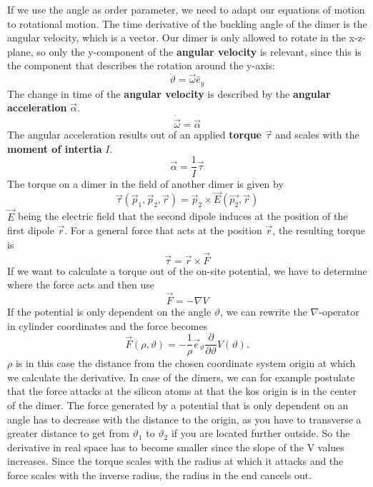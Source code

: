 	If we use the angle as order parameter, we need to adapt our equations of motion to rotational motion. The time derivative of the buckling angle of the dimer is the angular velocity, which is a vector. Our dimer is only allowed to rotate in the x-z-plane, so only the y-component of the \textbf{angular velocity} is relevant, since this is the component that describes the rotation around the y-axis:
	\begin{equation}
		\dot{\vartheta} =	\vec{\omega} \hat{e}_y
	\end{equation}
	The change in time of the \textbf{angular velocity} is described by the \textbf{angular acceleration} $\vec{\alpha}$.
	\begin{equation}
		\dot{\vec{\omega}} =	\vec{\alpha}
	\end{equation}
	The angular acceleration results out of an applied \textbf{torque} $\vec{\tau}$ and scales with the \textbf{moment of intertia} $I$.
	\begin{equation}
		\vec{\alpha}=	\frac{1}{I} \vec{\tau}
	\end{equation}
	The torque on a dimer in the field of another dimer is given by
	\begin{equation}
		\vec{\tau}(\vec{p}_1, \vec{p}_2, \vec{r}) =	\vec{p}_2 \times \vec{E}(\vec{p_2}, \vec{r})
	\end{equation}
	$\vec{E}$ being the electric field that the second dipole induces at the position of the first dipole $\vec{r}$. For a general force that acts at the position $\vec{r}$, the resulting torque is
	\begin{equation}
		\vec{\tau} =	\vec{r} \times \vec{F}
	\end{equation}
	If we want to calculate a torque out of the on-site potential, we have to determine where the force acts and then use
	\begin{equation}
		\vec{F} =	- \nabla V
	\end{equation}
	If the potential is only dependent on the angle $\vartheta$, we can rewrite the $\nabla$-operator in cylinder coordinates and the force becomes
	\begin{equation}
		\vec{F}(\rho, \vartheta) =	 - \frac{1}{\rho}  \vec{e}_\vartheta \frac{\partial}{\partial \vartheta} V(\vartheta).
	\end{equation}
	$\rho$ is in this case the distance from the chosen coordinate system origin at which we calculate the derivative. In case of the dimers, we can for example postulate that the force attacks at the silicon atoms at that the kos origin is in the center of the dimer. The force generated by a potential that is only dependent on an angle has to decrease with the distance to the origin, as you have to transverse a greater distance to get from $\vartheta_1$ to $\vartheta_2$ if you are located further outside. So the derivative in real space has to become smaller since the slope of the V values increases. Since the torque scales with the radius at which it attacks and the force scales with the inverse radius, the radius in the end cancels out.
	
